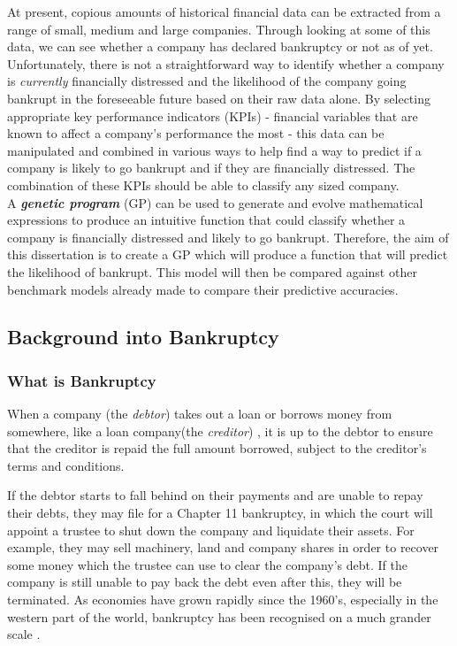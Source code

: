 \documentclass[11pt]{article}
\begin{document}
At present, copious amounts of historical financial data can be extracted from a range of small, medium and large companies. Through looking at some of this data, we can see whether a company has declared bankruptcy or not as of yet. Unfortunately, there is not a straightforward way to identify whether a company is \textit{currently} financially distressed and the likelihood of the company going bankrupt in the foreseeable future based on their raw data alone. By selecting appropriate key performance indicators (KPIs) - financial variables that are known to affect a company's performance the most - this data can be manipulated and combined in various ways to help find a way to predict if a company is likely to go bankrupt and if they are financially distressed. The combination of these KPIs should be able to classify any sized company. \\
A \textbf{\textit{genetic program}} (GP) can be used to generate and evolve mathematical expressions to produce an intuitive function that could classify whether a company is financially distressed and likely to go bankrupt. Therefore, the aim of this dissertation is to create a GP which will produce a function that will predict the likelihood of bankrupt. This model will then be compared against other benchmark models already made to compare their predictive accuracies. \\

\subsection{Background into Bankruptcy}\label{subsec:intro2B}%
\subsubsection{What is Bankruptcy}\label{subsubsec:bankdef}
When a company (the \textit{debtor}) takes out a loan or borrows money from somewhere, like a loan company(the \textit{creditor}) , it is up to the debtor to ensure that the creditor is repaid the full amount borrowed, subject to the creditor's terms and conditions.

If the debtor starts to fall behind on their payments and are unable to repay their debts, they may file for a Chapter 11 bankruptcy, in which the court will appoint a trustee to shut down the company and liquidate their assets. For example, they may sell machinery, land and company shares in order to recover some money which the trustee can use to clear the company's debt. If the company is still unable to pay back the debt even after this, they will be terminated. As economies have grown rapidly since the 1960's, especially in the western part of the world, bankruptcy has been recognised on a much grander scale \cite{ref-three}.
\end{document}
